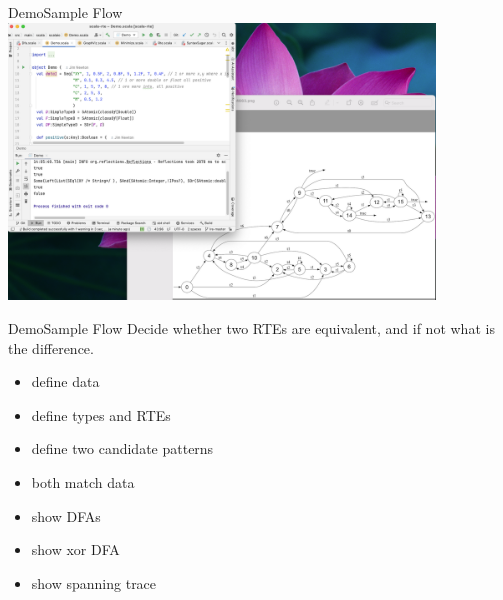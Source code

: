 \begin{frame}{Demo}{Sample Flow}
  \centering
   \includegraphics[width=0.85\textwidth]{demo.png}
\end{frame}


\begin{frame}{Demo}{Sample Flow}
  Decide whether two RTEs are equivalent, and if not what is the difference.


  \begin{itemize}
  \item define data
  \item define types and RTEs
  \item define two candidate patterns
  \item both match data
  \item show DFAs
  \item show xor DFA
  \item show spanning trace
  \end{itemize}

\end{frame}
